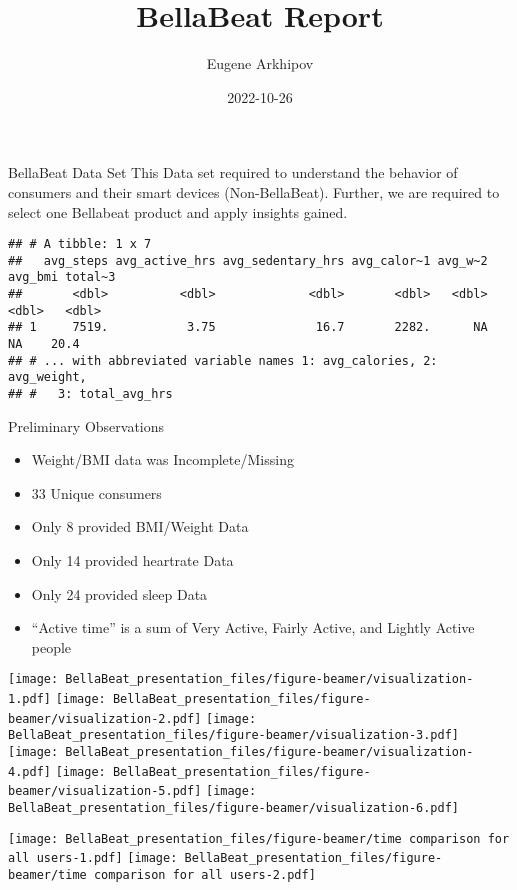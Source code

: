 \documentclass[
  ignorenonframetext,
]{beamer}
\title{BellaBeat Report}
\author{Eugene Arkhipov}
\date{2022-10-26}
\providecommand{\tightlist}{%
  \setlength{\itemsep}{0pt}\setlength{\parskip}{0pt}}
\begin{document}
\frame{\titlepage}

\begin{frame}[fragile]{BellaBeat Data Set}
\protect\hypertarget{bellabeat-data-set}{}
This Data set required to understand the behavior of consumers and their
smart devices (Non-BellaBeat). Further, we are required to select one
Bellabeat product and apply insights gained.

\begin{verbatim}
## # A tibble: 1 x 7
##   avg_steps avg_active_hrs avg_sedentary_hrs avg_calor~1 avg_w~2 avg_bmi total~3
##       <dbl>          <dbl>             <dbl>       <dbl>   <dbl>   <dbl>   <dbl>
## 1     7519.           3.75              16.7       2282.      NA      NA    20.4
## # ... with abbreviated variable names 1: avg_calories, 2: avg_weight,
## #   3: total_avg_hrs
\end{verbatim}
\end{frame}

\begin{frame}{Preliminary Observations}
\protect\hypertarget{preliminary-observations}{}
\begin{itemize}
\tightlist
\item
  Weight/BMI data was Incomplete/Missing
\item
  33 Unique consumers
\item
  Only 8 provided BMI/Weight Data
\item
  Only 14 provided heartrate Data
\item
  Only 24 provided sleep Data
\item
  ``Active time'' is a sum of Very Active, Fairly Active, and Lightly
  Active people
\end{itemize}

\texttt{[image: BellaBeat\_presentation\_files/figure-beamer/visualization-1.pdf]}
\texttt{[image: BellaBeat\_presentation\_files/figure-beamer/visualization-2.pdf]}
\texttt{[image: BellaBeat\_presentation\_files/figure-beamer/visualization-3.pdf]}
\texttt{[image: BellaBeat\_presentation\_files/figure-beamer/visualization-4.pdf]}
\texttt{[image: BellaBeat\_presentation\_files/figure-beamer/visualization-5.pdf]}
\texttt{[image: BellaBeat\_presentation\_files/figure-beamer/visualization-6.pdf]}

\texttt{[image: BellaBeat\_presentation\_files/figure-beamer/time comparison for all users-1.pdf]}
\texttt{[image: BellaBeat\_presentation\_files/figure-beamer/time comparison for all users-2.pdf]}
\end{frame}
\end{document}
